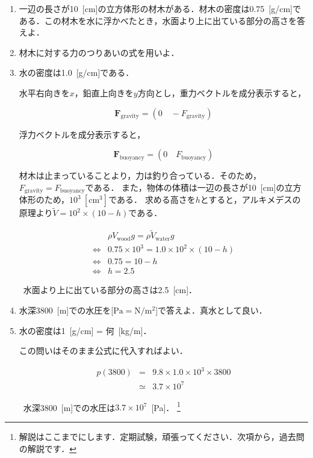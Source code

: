 \documentclass[a4paper,11pt]{ltjsarticle}
\begin{document}
\begin{enumerate}
  \item 一辺の長さが10\ [cm]の立方体形の材木がある．材木の密度は0.75\ [g/cm]である．この材木を水に浮かべたとき，水面より上に出ている部分の高さを答えよ．
  \item[HINT] 材木に対する力のつりあいの式を用いよ．
  \item[] 水の密度は1.0\ [g/cm]である．


  水平右向きを$x$，鉛直上向きを$y$方向とし，重力ベクトルを成分表示すると，

  \begin{equation}
    \bm{F}_{\mathrm{gravity}} = (0 \quad - F_{\mathrm{gravity}})
  \end{equation}

  浮力ベクトルを成分表示すると，

  \begin{equation}
    \bm{F}_{\mathrm{buoyancy}} = (0 \quad F_{\mathrm{buoyancy}})
  \end{equation}

  材木は止まっていることより，力は釣り合っている．そのため，$F_{\mathrm{gravity}} = F_{\mathrm{buoyancy}}$である．
  また，物体の体積は一辺の長さが10\ [cm]の立方体形のため，$10^3\ [\mathrm{cm^3}]$である．
  求める高さを$h$とすると，アルキメデスの原理より$\tilde{V} = 10^2 \times (10-h)$である．

  \begin{equation}
  \renewcommand{\arraystretch}{2}
    \begin{array}{rl}
      & \rho V_{\mathrm{wood}}g = \rho \tilde{V}_{\mathrm{water}}g \\
      \Leftrightarrow & 0.75 \times 10^3 = 1.0 \times 10^2 \times (10-h) \\
      \Leftrightarrow & 0.75 = 10-h \\
      \Leftrightarrow & h = 2.5
    \end{array}
  \end{equation}

  \therefore\ 水面より上に出ている部分の高さは2.5\ [cm]．

  
  \item 水深3800\ [m]での水圧を[$\mathrm{Pa=N/m^2}$]で答えよ．真水として良い．
  \item[HINT] 水の密度は1\ [g/cm] = 何\ [kg/m]．


  この問いはそのまま公式に代入すればよい．

    \begin{equation}
  \renewcommand{\arraystretch}{2}
    \begin{array}{rcl}
      p(3800) &=& 9.8 \times 1.0 \times 10^3 \times 3800 \\
      &\simeq& 3.7 \times 10^7
    \end{array}
  \end{equation}

    \therefore\ 水深3800\ [m]での水圧は$3.7 \times 10^7$\ [Pa]．
    \footnote{解説はここまでにします．定期試験，頑張ってください．次項から，過去問の解説です．}
\end{enumerate}
\end{document}
